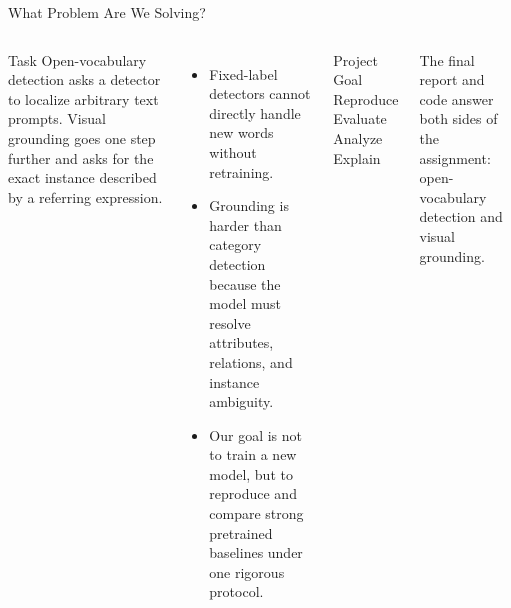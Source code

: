\documentclass[aspectratio=169,professionalfonts]{beamer}
\begin{document}
\begin{frame}{What Problem Are We Solving?}
  \begin{columns}[T,onlytextwidth]
    \begin{block}{Task}
      Open-vocabulary detection asks a detector to localize arbitrary text prompts.
      Visual grounding goes one step further and asks for the exact instance
      described by a referring expression.
    \end{block}

    \begin{itemize}
      \item Fixed-label detectors cannot directly handle new words without retraining.
      \item Grounding is harder than category detection because the model must resolve
            attributes, relations, and instance ambiguity.
      \item Our goal is not to train a new model, but to reproduce and compare strong
            pretrained baselines under one rigorous protocol.
    \end{itemize}

    \begin{block}{Project Goal}
      \centering
      \large
      Reproduce \\
      Evaluate \\
      Analyze \\
      Explain
    \end{block}

    \vspace{0.35em}
    \footnotesize
    The final report and code answer both sides of the assignment:
    open-vocabulary detection and visual grounding.
  \end{columns}
\end{frame}
\end{document}
